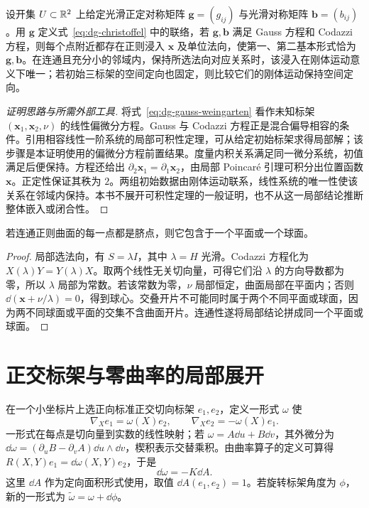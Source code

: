 \begin{theorem}
设开集 $U\subset\mathbb R^2$ 上给定光滑正定对称矩阵 $\mathbf g=(g_{ij})$ 与光滑对称矩阵 $\mathbf b=(b_{ij})$。用 $\mathbf g$ 定义式~\eqref{eq:dg-christoffel} 中的联络，若 $\mathbf g,\mathbf b$ 满足 Gauss 方程和 Codazzi 方程，则每个点附近都存在正则浸入 $\mathbf x$ 及单位法向，使第一、第二基本形式恰为 $\mathbf g,\mathbf b$。在连通且充分小的邻域内，保持所选法向对应关系时，该浸入在刚体运动意义下唯一；若初始三标架的空间定向也固定，则比较它们的刚体运动保持空间定向。
\label{thm:dg-surface-fundamental}
\end{theorem}
\begin{proof}[证明思路与所需外部工具]
将式~\eqref{eq:dg-gauss-weingarten} 看作未知标架 $(\mathbf x_1,\mathbf x_2,\nu)$ 的线性偏微分方程。Gauss 与 Codazzi 方程正是混合偏导相容的条件。引用相容线性一阶系统的局部可积性定理，可从给定初始标架求得局部解；该步骤是本证明使用的偏微分方程前置结果。度量内积关系满足同一微分系统，初值满足后便保持。方程还给出 $\partial_2\mathbf x_1=\partial_1\mathbf x_2$，由局部 Poincar\'e 引理可积分出位置函数 $\mathbf x$。正定性保证其秩为 $2$。两组初始数据由刚体运动联系，线性系统的唯一性使该关系在邻域内保持。本书不展开可积性定理的一般证明，也不从这一局部结论推断整体嵌入或闭合性。
\end{proof}

\begin{corollary}[全脐曲面的刚性]
若连通正则曲面的每一点都是脐点，则它包含于一个平面或一个球面。
\end{corollary}
\begin{proof}
局部选法向，有 $S=\lambda I$，其中 $\lambda=H$ 光滑。Codazzi 方程化为 $X(\lambda)Y=Y(\lambda)X$。取两个线性无关切向量，可得它们沿 $\lambda$ 的方向导数都为零，所以 $\lambda$ 局部为常数。若该常数为零，$\nu$ 局部恒定，曲面局部在平面内；否则 $\dd(\mathbf x+\nu/\lambda)=0$，得到球心。交叠开片不可能同时属于两个不同平面或球面，因为两不同球面或平面的交集不含曲面开片。连通性遂将局部结论拼成同一个平面或球面。
\end{proof}

\section{正交标架与零曲率的局部展开}
在一个小坐标片上选正向标准正交切向标架 $e_1,e_2$，定义一形式 $\omega$ 使
\[
 \nabla_Xe_1=\omega(X)e_2,\qquad
 \nabla_Xe_2=-\omega(X)e_1.
\]
一形式在每点是切向量到实数的线性映射；若 $\omega=A\dd u+B\dd v$，其外微分为 $\dd\omega=(\partial_uB-\partial_vA)\dd u\wedge\dd v$，楔积表示交替乘积。由曲率算子的定义可算得 $R(X,Y)e_1=\dd\omega(X,Y)e_2$，于是
\begin{equation}
 \dd\omega=-K\dd A.
 \label{eq:dg-connection-curvature}
\end{equation}
这里 $\dd A$ 作为定向面积形式使用，取值 $\dd A(e_1,e_2)=1$。若旋转标架角度为 $\phi$，新的一形式为 $\widetilde\omega=\omega+\dd\phi$。

